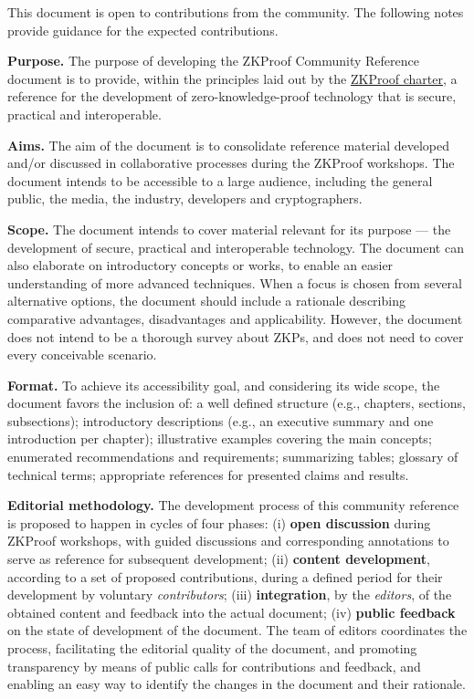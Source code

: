\label{sec:prelim:open-to-contributions}

	This document is open to contributions from the community. 
	The following notes provide guidance for the expected contributions.


\textbf{Purpose.}
	The purpose of developing the ZKProof Community Reference document is to provide, 
within the principles laid out by the \hyperref[sec:prelim:charter]{ZKProof charter}, 
a reference for the development of zero-knowledge-proof technology that is secure, practical and interoperable.


\textbf{Aims.}
	The aim of the document is to consolidate reference material developed and/or discussed in collaborative processes during the ZKProof workshops. 
	The document intends to be accessible to a large audience, including the general public, the media, the industry, developers and cryptographers.


\textbf{Scope.}
	The document intends to cover material relevant for its purpose --- the development of secure, practical and interoperable technology.
	The document can also elaborate on introductory concepts or works, to enable an easier understanding of more advanced techniques. 
	When a focus is chosen from several alternative options, the document should include a rationale describing comparative advantages, disadvantages and applicability. 
	However, the document does not intend to be a thorough survey about ZKPs, and does not need to cover every conceivable scenario.


\textbf{Format.}
	To achieve its accessibility goal, and considering its wide scope, the document favors the inclusion of: 
	a well defined structure (e.g., chapters, sections, subsections);
	introductory descriptions (e.g., an executive summary and one introduction per chapter); 
	illustrative examples covering the main concepts; 
	enumerated recommendations and requirements; 
	summarizing tables; 
	glossary of technical terms; 
	appropriate references for presented claims and results.


\textbf{Editorial methodology.}
	The development process of this community reference is proposed to happen in cycles of four phases:
	(i) \textbf{open discussion} during ZKProof workshops, with guided discussions and corresponding annotations to serve as reference for subsequent development;
	(ii) \textbf{content development}, according to a set of proposed contributions, during a defined period for their development by voluntary \emph{contributors};
	(iii) \textbf{integration}, by the \emph{editors}, of the obtained content and feedback into the actual document; 
	(iv) \textbf{public feedback} on the state of development of the document.
	The team of editors coordinates the process, facilitating the editorial quality of the document,
and promoting transparency by means of public calls for contributions and feedback, 
and enabling an easy way to identify the changes in the document and their rationale.

